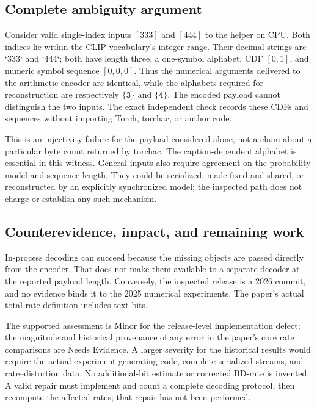 \documentclass[10pt]{article}
\begin{document}
\subsection*{Complete ambiguity argument}
Consider valid single-index inputs \([333]\) and \([444]\) to the helper on CPU. Both indices lie within the CLIP vocabulary’s integer range. Their decimal strings are `333` and `444`; both have length three, a one-symbol alphabet, CDF \([0,1]\), and numeric symbol sequence \([0,0,0]\). Thus the numerical arguments delivered to the arithmetic encoder are identical, while the alphabets required for reconstruction are respectively \(\{\texttt{3}\}\) and \(\{\texttt{4}\}\). The encoded payload cannot distinguish the two inputs. The exact independent check records these CDFs and sequences without importing Torch, torchac, or author code.\par
This is an injectivity failure for the payload considered alone, not a claim about a particular byte count returned by torchac. The caption-dependent alphabet is essential in this witness. General inputs also require agreement on the probability model and sequence length. They could be serialized, made fixed and shared, or reconstructed by an explicitly synchronized model; the inspected path does not charge or establish any such mechanism.\par
\subsection*{Counterevidence, impact, and remaining work}
In-process decoding can succeed because the missing objects are passed directly from the encoder. That does not make them available to a separate decoder at the reported payload length. Conversely, the inspected release is a 2026 commit, and no evidence binds it to the 2025 numerical experiments. The paper’s actual total-rate definition includes text bits.\par
The supported assessment is Minor for the release-level implementation defect; the magnitude and historical provenance of any error in the paper’s core rate comparisons are Needs Evidence. A larger severity for the historical results would require the actual experiment-generating code, complete serialized streams, and rate–distortion data. No additional-bit estimate or corrected BD-rate is invented. A valid repair must implement and count a complete decoding protocol, then recompute the affected rates; that repair has not been performed.\par
\end{document}
